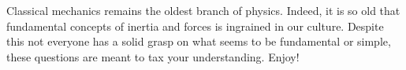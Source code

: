 Classical mechanics remains the oldest branch of physics. Indeed, it is so old that fundamental concepts of inertia and forces is ingrained in our culture. Despite this not everyone has a solid grasp on what seems to be fundamental or simple, these questions are meant to tax your understanding. Enjoy!